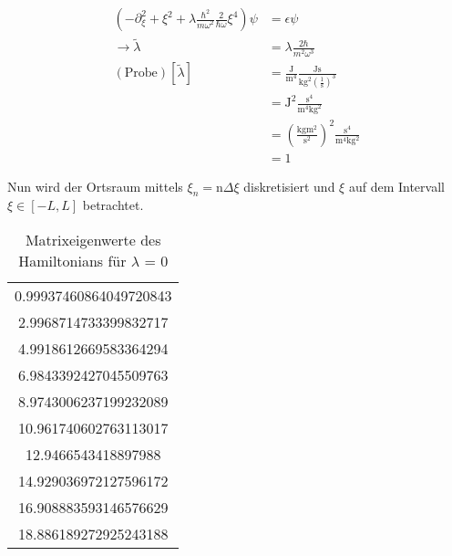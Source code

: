 \begin{align}
	\left( - \partial_{\xi}^2+\xi^2+\lambda \frac{\hbar^2}{m\omega^2}\frac{2}{\hbar \omega} \xi^4 \right) \psi &= \epsilon \psi \\
	\rightarrow \tilde{\lambda} &= \lambda \frac{ 2 \hbar }{m^2 \omega^3} \\
	\left(\text{Probe}\right)[\tilde{\lambda}] &= \frac{\mathup{J}}{\mathup{m^4}} \frac{\mathup{Js}}{\mathup{kg^2} \left(\frac{1}{\mathup{s}}\right)^3} \\
	&= \mathup{J^2} \frac{\mathup{s^4}}{\mathup{m^4kg^2}} \\
	&= \left( \frac{\mathup{kg m^2}}{\mathup{s^2}}\right)^2 \frac{\mathup{s^4}}{\mathup{m^4kg^2}}\\
	&= 1
\end{align}

Nun wird der Ortsraum mittels $\xi_n = \mathup{n} \Delta \xi$ diskretisiert und $\xi$ auf dem Intervall $\xi \in [-L,L]$ betrachtet.
\begin{table}[]
\centering
\caption{Matrixeigenwerte des Hamiltonians für $\lambda$ = 0}
\label{table:2b0eigenvalues}
\begin{tabular}{c}
0.99937460864049720843 \\
2.9968714733399832717 \\
4.9918612669583364294 \\
6.9843392427045509763 \\
8.9743006237199232089 \\
10.961740602763113017 \\
12.9466543418897988 \\
14.929036972127596172 \\
16.908883593146576629 \\
18.886189272925243188 \\
\end{tabular}
\end{table}


